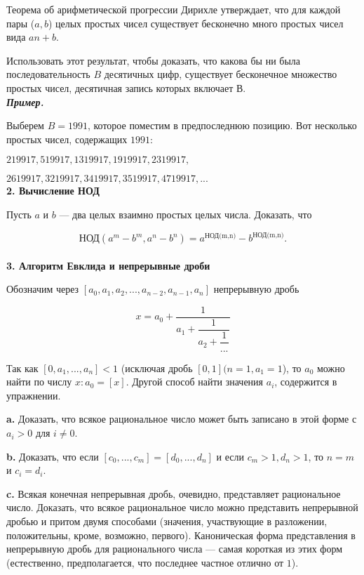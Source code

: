 \documentclass{mai_book}
\begin{document}
Теорема об арифметической прогрессии Дирихле утверждает, что
для каждой пары ($a, b$) целых простых чисел существует бесконечно
много простых чисел вида $an+b$. 

Использовать этот результат, чтобы доказать, что какова бы ни была последовательность $B$ десятичных цифр, существует бесконечное множество простых чисел, десятичная запись которых включает $В$.
\\

\noindent \textbf{\textit{Пример.}}

Выберем $B = 1991$, которое поместим в предпоследнюю позицию.
Вот несколько простых чисел, содержащих $1991$:

$219917, 519917, 1319917, 1919917, 2319917,$

$2619917, 3219917, 3419917, 3519917, 4719917, ...$
\\

\noindent \textbf{2. Вычисление НОД}

Пусть $a$ и $b$ — два целых взаимно простых целых числа. Доказать,
что

\[
\text{НОД}(a^m-b^m,a^n-b^n)=a^{\text{НОД(m,n)}}-b^{\text{НОД(m,n)}}.
\]
\\

\noindent \textbf{3. Алгоритм Евклида и непрерывные дроби}

Обозначим через $[a_0,a_1,a_2,...,a_{n-2},a_{n-1},a_{n}]$ непрерывную дробь

\[
x = a_0+\dfrac{1}{a_1+\dfrac{1}{a_2+\dfrac{1}{...}}}
\]

\noindent Так как $[0,a_1,...,a_n] < 1$ (исключая дробь $[0,1] (n=1,a_1=1$), то $a_0$
можно найти по числу $x: a_0=[x]$. Другой способ найти значения $a_i$,
содержится в упражнении.

\textbf{a.} Доказать, что всякое рациональное число может быть записано
в этой форме с $a_i>0$ для $i \ne 0$.

\textbf{b.} Доказать, что если $[c_0,...,c_m]=[d_0,...,d_n]$ и если $c_m>1,d_n>1$, то $n=m$ и $c_i=d_i$.

\textbf{c.} Всякая конечная непрерывная дробь, очевидно, представляет 
рациональное число. Доказать, что всякое рациональное число можно
представить непрерывной дробью и притом двумя способами 
(значения, участвующие в разложении, положительны, кроме, возможно, 
первого). Каноническая форма представления в непрерывную дробь для
рационального числа — самая короткая из этих форм (естественно,
предполагается, что последнее частное отлично от $1$).
\end{document}
